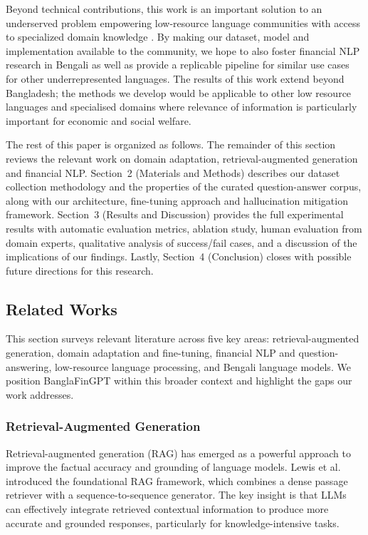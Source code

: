 \documentclass{article}
\begin{document}
Beyond technical contributions, this work is an important solution to an underserved
problem empowering low-resource language communities with access to specialized domain
knowledge \cite{Bisk2020}. By making our dataset, model and implementation available to
the community, we hope to also foster financial NLP research in Bengali as well as
provide a replicable pipeline for similar use cases for other underrepresented
languages. The results of this work extend beyond Bangladesh; the methods we develop
would be applicable to other low resource languages and specialised domains where
relevance of information is particularly important for economic and social welfare.

The rest of this paper is organized as follows. The remainder of this section reviews
the relevant work on domain adaptation, retrieval-augmented generation and financial
NLP. Section~2 (Materials and Methods) describes our dataset collection methodology and
the properties of the curated question-answer corpus, along with our architecture,
fine-tuning approach and hallucination mitigation framework. Section~3 (Results and
Discussion) provides the full experimental results with automatic evaluation metrics,
ablation study, human evaluation from domain experts, qualitative analysis of
success/fail cases, and a discussion of the implications of our findings. Lastly,
Section~4 (Conclusion) closes with possible future directions for this research.

\subsection{Related Works}

This section surveys relevant literature across five key areas: retrieval-augmented
generation, domain adaptation and fine-tuning, financial NLP and question-answering,
low-resource language processing, and Bengali language models. We position
BanglaFinGPT within this broader context and highlight the gaps our work addresses.

\subsubsection{Retrieval-Augmented Generation}

Retrieval-augmented generation (RAG) has emerged as a powerful approach to improve the
factual accuracy and grounding of language models. Lewis et al.~\cite{Lewis2020}
introduced the foundational RAG framework, which combines a dense passage retriever
with a sequence-to-sequence generator. The key insight is that LLMs can effectively
integrate retrieved contextual information to produce more accurate and grounded
responses, particularly for knowledge-intensive tasks.
\end{document}
